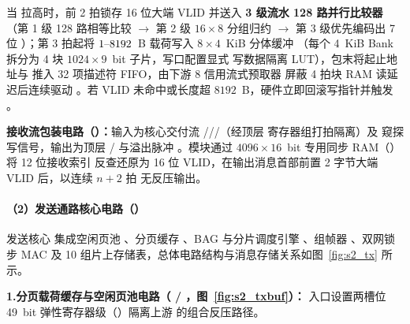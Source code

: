 
当  拉高时，前 2 拍锁存 16 位大端 VLID 并送入 \textbf{3 级流水 128 路并行比较器}（第 1 级 128 路相等比较 $\rightarrow$ 第 2 级 $16\times 8$ 分组归约 $\rightarrow$ 第 3 级优先编码出 7 位 ）；第 3 拍起将 $1\text{--}8192$~B 载荷写入 $8\times 4$~KiB 分体缓冲 （每个 4~KiB Bank 拆分为 4 块 $1024\times 9$~bit 子片，写口配置显式  写数据隔离 LUT），包末将起止地址与  推入 32 项描述符 FIFO，由下游 8 信用流式预取器  屏蔽 4 拍块 RAM 读延迟后连续驱动 。若 VLID 未命中或长度超 $8192$~B，硬件立即回滚写指针并触发 。

\textbf{接收流包装电路（）：}输入为核心交付流 ///（经顶层  寄存器组打拍隔离）及  窥探写信号，输出为顶层 / 与溢出脉冲 。模块通过 $4096\times 16$~bit 专用同步 RAM（）将 12 位接收索引  反查还原为 16 位 VLID，在输出消息首部前置 2 字节大端 VLID 后，以连续 $n+2$ 拍  无反压输出。

\paragraph{（2）发送通路核心电路（）}

发送核心  集成空闲页池 、分页缓存 、BAG 与分片调度引擎 、组帧器 、双网锁步 MAC  及 10 组片上存储表，总体电路结构与消息存储关系如图~\ref{fig:s2_tx} 所示。


\noindent \textbf{1.\quad 分页载荷缓存与空闲页池电路（ / ，图~\ref{fig:s2_txbuf}）：}
 入口设置两槽位 49~bit 弹性寄存器级（）隔离上游  的组合反压路径。


